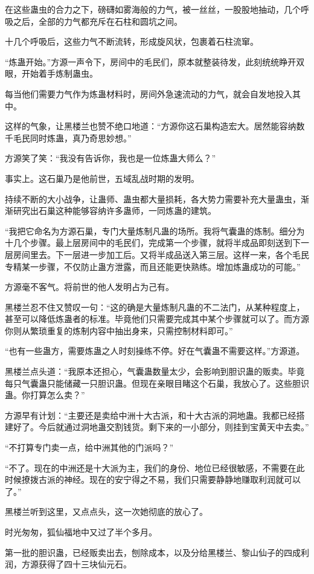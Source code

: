\begin{this_body}
在这些蛊虫的合力之下，磅礴如雾海般的力气，被一丝丝，一股股地抽动，几个呼吸之后，全部的力气都充斥在石柱和圆坑之间。

十几个呼吸后，这些力气不断流转，形成旋风状，包裹着石柱流窜。

“炼蛊开始。”方源一声令下，房间中的毛民们，原本就整装待发，此刻统统睁开双眼，开始着手炼制蛊虫。

每当他们需要力气作为炼蛊材料时，房间外急速流动的力气，就会自发地投入其中。

这样的气象，让黑楼兰也赞不绝口地道：“方源你这石巢构造宏大。居然能容纳数千毛民同时炼蛊，真乃奇思妙想。”

方源笑了笑：“我没有告诉你，我也是一位炼蛊大师么？”

事实上。这石巢乃是他前世，五域乱战时期的发明。

持续不断的大小战争，让蛊师、蛊虫都大量损耗，各大势力需要补充大量蛊虫，渐渐研究出石巢这种能够容纳许多蛊师，一同炼蛊的建筑。

“我把它命名为方源石巢，专门大量炼制凡蛊的场所。我将气囊蛊的炼制。细分为十几个步骤。最上层房间中的毛民们，完成第一个步骤，就将半成品即刻送到下一层房间里去。下一层进一步加工后。又将半成品送入第三层。这样一来，各个毛民专精某一步骤，不仅防止蛊方泄露，而且还能更快熟练。增加炼蛊成功的可能。”

方源毫不客气。将前世的他人发明占为己有。

黑楼兰忍不住又赞叹一句：“这的确是大量炼制凡蛊的不二法门，从某种程度上，甚至可以降低炼蛊者的标准。毕竟他们只需要完成其中某个步骤就可以了。而方源你则从繁琐重复的炼制内容中抽出身来，只需控制材料即可。”

“也有一些蛊方，需要炼蛊之人时刻操练不停。好在气囊蛊不需要这样。”方源道。

黑楼兰点头道：“我原本还担心，气囊蛊数量太少，会影响到胆识蛊的贩卖。毕竟每只气囊蛊只能储藏一只胆识蛊。但现在亲眼目睹这个石巢，我放心了。这些胆识蛊。你打算怎么卖？”

方源早有计划：“主要还是卖给中洲十大古派，和十大古派的洞地蛊。我都已经搭建好了。今后就通过洞地蛊交割钱货。剩下来的一小部分，则挂到宝黄天中去卖。”

“不打算专门卖一点，给中洲其他的门派吗？”

“不了。现在的中洲还是十大派为主，我们的身份、地位已经很敏感，不需要在此时候撩拨古派的神经。现在的安宁得之不易，我们只需要静静地赚取利润就可以了。”

黑楼兰听到这里，又点点头，这一次她彻底的放心了。

时光匆匆，狐仙福地中又过了半个多月。

第一批的胆识蛊，已经贩卖出去，刨除成本，以及分给黑楼兰、黎山仙子的四成利润，方源获得了四十三块仙元石。


\end{this_body}
